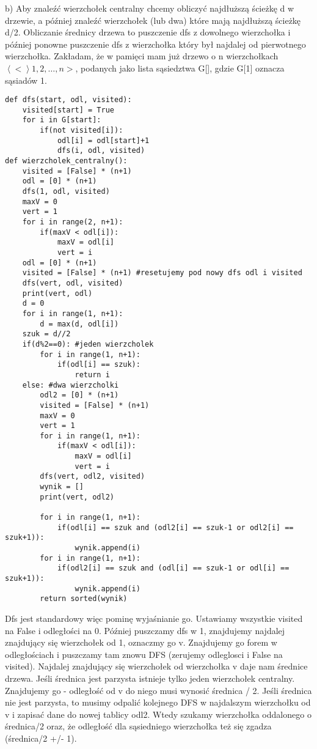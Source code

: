 \documentclass[12pt]{article}
\newcommand{\sequence}[1]{\left\langle #1 \right\rangle} %
\begin{document}
b)
Aby znaleźć wierzchołek centralny chcemy obliczyć najdłuższą ścieżkę d w drzewie, a później znaleźć wierzchołek (lub dwa) które mają najdłuższą ścieżkę d/2.
Obliczanie średnicy drzewa to puszczenie dfs z dowolnego wierzchołka i później ponowne puszczenie dfs z wierzchołka który był najdalej od pierwotnego wierzchołka.
Zakładam, że w pamięci mam już drzewo o n wierzchołkach $\sequence<1, 2, \dots, n>$, podanych jako lista sąsiedztwa G[], gdzie G[1] oznacza sąsiadów 1.
\begin{lstlisting}
def dfs(start, odl, visited):
    visited[start] = True
    for i in G[start]:
        if(not visited[i]):
            odl[i] = odl[start]+1 
            dfs(i, odl, visited)
def wierzcholek_centralny():
    visited = [False] * (n+1)
    odl = [0] * (n+1)
    dfs(1, odl, visited)
    maxV = 0
    vert = 1
    for i in range(2, n+1):
        if(maxV < odl[i]):
            maxV = odl[i]
            vert = i
    odl = [0] * (n+1)
    visited = [False] * (n+1) #resetujemy pod nowy dfs odl i visited
    dfs(vert, odl, visited)
    print(vert, odl)
    d = 0 
    for i in range(1, n+1):
        d = max(d, odl[i])
    szuk = d//2
    if(d%2==0): #jeden wierzcholek 
        for i in range(1, n+1):
            if(odl[i] == szuk):
                return i    
    else: #dwa wierzcholki 
        odl2 = [0] * (n+1)
        visited = [False] * (n+1)
        maxV = 0
        vert = 1
        for i in range(1, n+1):
            if(maxV < odl[i]):
                maxV = odl[i]
                vert = i
        dfs(vert, odl2, visited)
        wynik = []
        print(vert, odl2)

        for i in range(1, n+1):
            if(odl[i] == szuk and (odl2[i] == szuk-1 or odl2[i] == szuk+1)):
                wynik.append(i)
        for i in range(1, n+1):
            if(odl2[i] == szuk and (odl[i] == szuk-1 or odl[i] == szuk+1)):
                wynik.append(i)
        return sorted(wynik)
\end{lstlisting}

Dfs jest standardowy więc pominę wyjaśnianie go. 
Ustawiamy wszystkie visited na False i odległości na 0. Później puszczamy dfs w 1, znajdujemy najdalej znajdujący się wierzchołek od 1, oznaczmy go v. Znajdujemy go forem w odległościach i puszczamy tam znowu DFS (zerujemy odleglosci i False na visited). Najdalej znajdujący się wierzchołek od wierzchołka v daje nam średnice drzewa. Jeśli średnica jest parzysta istnieje tylko jeden wierzchołek centralny. Znajdujemy go - odległość od v do niego musi wynosić średnica / 2.
Jeśli średnica nie jest parzysta, to musimy odpalić kolejnego DFS w najdalszym wierzchołku od v i zapisać dane do nowej tablicy odl2. Wtedy szukamy wierzchołka oddalonego o średnica/2 oraz, że odległość dla sąsiedniego wierzchołka też się zgadza (średnica/2 +/- 1). 
\end{document}
